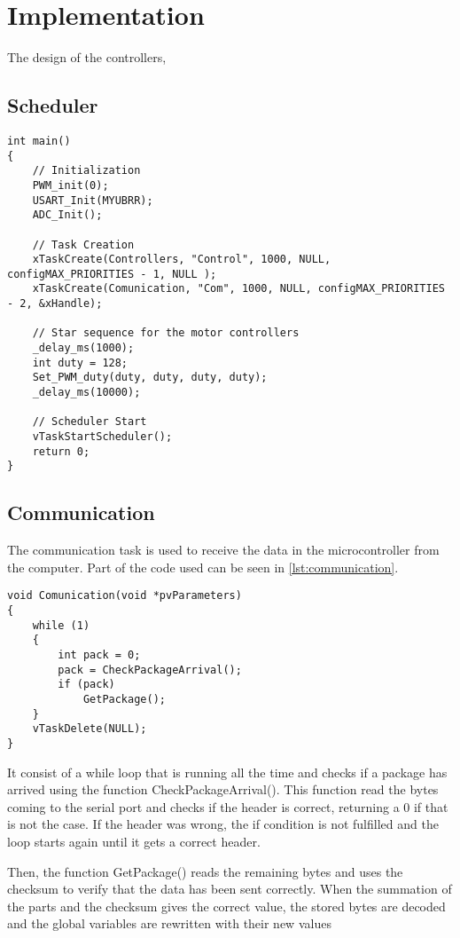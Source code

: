 \chapter{Implementation}

The design of the controllers,  



\section{Scheduler}
\begin{lstlisting}[style=customcpp,
                    caption={Code for initialization, creation of the different tasks, start sequence for the motors and call to the scheduler.}, 
                    label=lst:scheduler]
int main()
{
    // Initialization
    PWM_init(0);
    USART_Init(MYUBRR);
    ADC_Init();
    
    // Task Creation
    xTaskCreate(Controllers, "Control", 1000, NULL, configMAX_PRIORITIES - 1, NULL );
    xTaskCreate(Comunication, "Com", 1000, NULL, configMAX_PRIORITIES - 2, &xHandle);
    
    // Star sequence for the motor controllers
    _delay_ms(1000);
    int duty = 128;
    Set_PWM_duty(duty, duty, duty, duty);
    _delay_ms(10000);
 
    // Scheduler Start
    vTaskStartScheduler();
    return 0;
}                    
\end{lstlisting}


\section{Communication}
The communication task is used to receive the data in the microcontroller from the computer. Part of the code used can be seen in \autoref{lst:communication}.

\begin{lstlisting}[style=customcpp,
                caption={Code for the comunication task.}, 
                label=lst:communication]
void Comunication(void *pvParameters)
{
    while (1)
    {
        int pack = 0;
        pack = CheckPackageArrival();
        if (pack)
            GetPackage();
    }
    vTaskDelete(NULL);
}
\end{lstlisting}

It consist of a while loop that is running all the time and checks if a package has arrived using the function CheckPackageArrival(). This function read the bytes coming to the serial port and checks if the header is correct, returning a 0 if that is not the case. If the header was wrong, the if condition is not fulfilled and the loop starts again until it gets a correct header.

Then, the function GetPackage() reads the remaining bytes and uses the checksum to verify that the data has been sent correctly. When the summation of the parts and the checksum gives the correct value, the stored bytes are decoded and the global variables are rewritten with their new values


